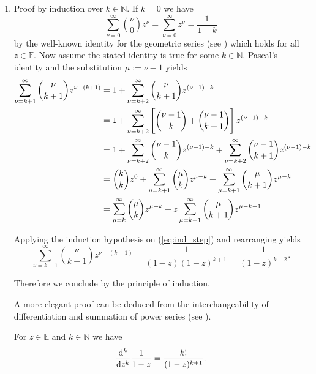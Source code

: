 \begin{enumerate}[label = \textbf{Exercise \arabic*.},wide = 0pt, itemsep=1.5ex]
	\item Proof by induction over $k \in \mathbb{N}$. If $k = 0$ we have 
		\begin{equation}
			\sum_{\nu = 0}^\infty {\nu \choose 0} z^\nu = \sum_{\nu = 0}^\infty z^\nu = \frac{1}{1 - k}
		\end{equation}
		\noindent by the well-known identity for the geometric series (see \cite[24]{remmert2002funktionentheorie}) which holds for all $z \in \mathbb{E}$. Now assume the stated identity is true for some $k \in \mathbb{N}$. Pascal's identity and the substitution $\mu := \nu - 1$ yields
	\begin{align}
		\sum_{\nu = k + 1}^\infty {\nu \choose {k + 1}} z^{\nu - (k + 1)} &= 1 + \sum_{\nu = k + 2}^\infty {\nu \choose {k + 1}} z^{(\nu - 1) - k }\nonumber\\
		&= 1 +\sum_{\nu = k + 2}^\infty \sbr[4]{{{\nu - 1} \choose k } + {{\nu - 1} \choose {k + 1}}} z^{(\nu - 1) - k }\nonumber\\
		&= 1 + \sum_{\nu = k + 2}^\infty {{\nu - 1} \choose k }z^{(\nu - 1) - k} + \sum_{\nu = k + 2}^\infty{{\nu - 1} \choose {k + 1}} z^{(\nu - 1) - k }\label{eq:ind_step}\\
		&= {k \choose k}z^0 + \sum_{\mu = k + 1}^\infty {\mu \choose k }z^{\mu - k} + \sum_{\mu = k + 1}^\infty{\mu \choose {k + 1}} z^{\mu - k }\nonumber\\
		&= \sum_{\mu = k}^\infty {\mu \choose k }z^{\mu - k} + z\sum_{\mu = k + 1}^\infty{\mu \choose {k + 1}} z^{\mu - k - 1}\nonumber
	\end{align}

	Applying the induction hypothesis on (\ref{eq:ind_step}) and rearranging yields 
	\begin{equation}
		\sum_{\nu = k + 1}^\infty {\nu \choose {k + 1}} z^{\nu - (k + 1)} = \frac{1}{(1 - z)(1 - z)^{k + 1}} = \frac{1}{(1 - z)^{k + 2}}.	
	\end{equation}

	Therefore we conclude by the principle of induction.

	A more elegant proof can be deduced from the interchangeability of differentiation and summation of power series (see \cite[110]{remmert2002funktionentheorie}).

	\begin{lemma}
		For $z \in \mathbb{E}$ and $k \in \mathbb{N}$ we have 
		\begin{equation}
			\frac{\mathop{}\!\mathrm{d}^k}{\mathop{}\!\mathrm{d} z^k} \frac{1}{1 - z} = \frac{k!}{(1 - z)^{k + 1}}.
		\end{equation}
		\label{lem:ind}
	\end{lemma}


\end{enumerate}
